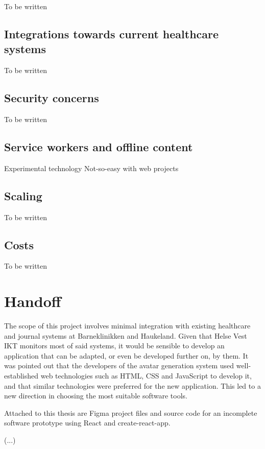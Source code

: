 To be written

\subsection{Integrations towards current healthcare systems}

To be written

\subsection{Security concerns}

To be written

\subsection{Service workers and offline content}

Experimental technology
Not-so-easy with web projects

\subsection{Scaling}

To be written

\subsection{Costs}

To be written

\section{Handoff}

The scope of this project involves minimal integration with existing healthcare and journal systems at Barneklinikken and Haukeland. Given that Helse Vest IKT monitors most of said systems, it would be sensible to develop an application that can be adapted, or even be developed further on, by them. It was pointed out that the developers of the avatar generation system used well-established web technologies such as HTML, CSS and JavaScript to develop it, and that similar technologies were preferred for the new application. This led to a new direction in choosing the most suitable software tools.

Attached to this thesis are Figma project files and source code for an incomplete software prototype using React and create-react-app.

(...)
